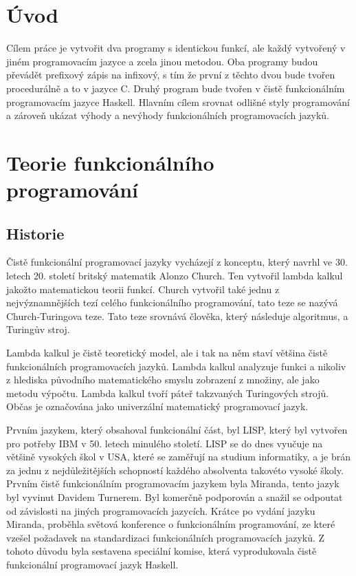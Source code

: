 \documentclass[12pt,a4paper]{report}
\begin{document}


\tableofcontents

\chapter{Úvod}
Cílem práce je vytvořit dva programy s identickou funkcí, ale každý vytvořený v jiném programovacím jazyce a zcela jinou metodou. Oba programy budou převádět prefixový zápis na infixový, s tím že první z těchto dvou bude tvořen procedurálně a to v jazyce C. Druhý program bude tvořen v čistě funkcionálním programovacím jazyce Haskell. Hlavním cílem srovnat odlišné styly programování a zároveň ukázat výhody a nevýhody funkcionálních programovacích jazyků. 

\chapter{Teorie funkcionálního programování} %

\section{Historie}
Čistě funkcionální programovací jazyky vycházejí z konceptu, který navrhl ve 30. letech 20. století britský matematik Alonzo Church. Ten vytvořil lambda kalkul jakožto matematickou teorii funkcí. Church vytvořil také jednu z nejvýznamnějších tezí celého funkcionálního programování, tato teze se nazývá Church-Turingova teze. \cite{Funk. prog. wiki.} Tato teze srovnává člověka, který následuje algoritmus, a Turingův stroj.

Lambda kalkul je čistě teoretický model, ale i tak na něm staví většina čistě funkcionálních programovacích jazyků. Lambda kalkul analyzuje funkci a nikoliv z hlediska původního matematického smyslu zobrazení z množiny, ale jako metodu výpočtu. \cite{lambda kalkul wiki.} Lambda kalkul tvoří páteř takzvaných Turingových strojů. Občas je označována jako univerzální matematický programovací jazyk.

Prvním jazykem, který obsahoval funkcionální část, byl LISP, který byl vytvořen pro potřeby IBM v 50. letech minulého století. LISP se do dnes vyučuje na většině vysokých škol v USA, které se zaměřují na studium informatiky, a je brán za jednu z nejdůležitějších schopností každého absolventa takovéto vysoké školy. Prvním čistě funkcionálním programovacím jazykem byla Miranda, tento jazyk byl vyvinut Davidem Turnerem. Byl komerčně podporován a snažil se odpoutat od závislosti na jiných programovacích jazycích. Krátce po vydání jazyku Miranda, proběhla světová konference o funkcionálním programování, ze které vzešel požadavek na standardizaci funkcionálních programovacích jazyků. Z tohoto důvodu byla sestavena speciální komise, která vyprodukovala čistě funkcionální programovací jazyk Haskell. 
\end{document}
